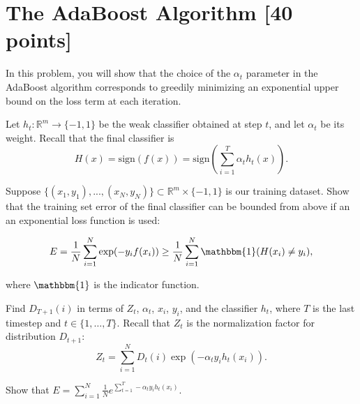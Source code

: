 \documentclass{article}
\begin{document}
\begin{solution}

\end{solution}



\newpage
\section{The AdaBoost Algorithm [40 points]}

In this problem, you will show that the choice of the $\alpha_t$ parameter in
the AdaBoost algorithm corresponds to greedily minimizing an exponential upper
bound on the loss term at each iteration.

\problem[3]
Let $h_t: \mathbb{R}^m \rightarrow \{-1,1\}$ be the weak classifier obtained at step $t$, and let $\alpha_t$ be
its weight. Recall that the final classifier is $$H(x) = \text{sign}(f(x)) = \text{sign} \left(\sum\limits_{i=1}^T \alpha_{t}h_t(x) \right).$$

Suppose $\{(x_1, y_1), ..., (x_N, y_N)\} \subset \mathbb{R}^m \times \{-1,1\}$ is our training dataset.  Show that the training set error of the final classifier can be bounded from
above if an an exponential loss function is used:

$$E = \frac{1}{N} \sum\limits_{i=1}^N \exp(-y_{i}f(x_i)) \geq \frac{1}{N} \sum\limits_{i=1}^N \mathbbm{1}(H(x_i) \neq y_i),$$

where $\mathbbm{1}$ is the indicator function.

\begin{solution}

\end{solution}

\problem[3]
Find $D_{T + 1}(i)$ in terms of $Z_t$, $\alpha_t$, $x_i$, $y_i$, and the classifier $h_t$, where $T$ is the last timestep and $t \in \{1, \ldots, T\}$. Recall that $Z_t$ is the normalization factor for distribution $D_{t+1}$:
$$Z_t = \sum\limits_{i=1}^N D_t(i) \exp(-\alpha_{t}y_{i}h_{t}(x_{i})).$$

\begin{solution}

\end{solution}

\problem[2]
Show that $E = \sum_{i=1}^N  \frac{1}{N} e^{\sum_{t=1}^T -\alpha_t y_i h_t(x_i)}.$

\begin{solution}

\end{solution}
\end{document}
